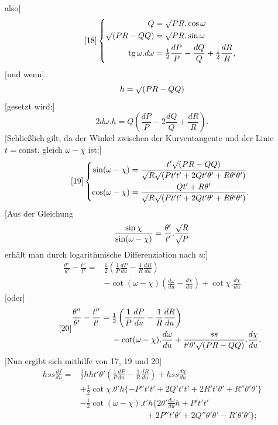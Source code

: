 %
\noindent also]
\begin{equation}\tag*{[18]}
\left\{\begin{aligned}
Q&=\mathord{\surd}PR.\cos\omega\\
\mathord{\surd}(PR-QQ)&=\mathord{\surd}PR.\sin\omega\\
\operatorname{tg}\omega.d\omega&=\tfrac12\frac{dP}{P}-\frac{dQ}{Q}+\tfrac12\frac{dR}{R},
\end{aligned}\right.
\end{equation}
[und wenn]
\[
h=\mathord{\surd}(PR-QQ)
\]
[gesetzt wird:]
\begin{equation}\tag*{[$18'$]}
2d\omega.h=Q\left(\frac{dP}{P}-2\frac{dQ}{Q}+\frac{dR}{R}\right).
\end{equation}
[Schließlich gilt, da der Winkel zwischen der Kurventangente und der Linie $t=\text{const.}$ gleich $\omega-\chi$ ist:]
\begin{equation}\tag*{[19]}
\left\{\begin{aligned}
\sin(\omega-\chi)&=\frac{t'\mathord{\surd}(PR-QQ)}{\mathord{\surd}R\mathord{\surd}(Pt't'+2Qt'\theta'+R\theta'\theta')}\\
\cos(\omega-\chi)&=\frac{Qt'+R\theta'}{\mathord{\surd}R\mathord{\surd}(Pt't'+2Qt'\theta'+R\theta'\theta')}.
\end{aligned}\right.
\end{equation}
[Aus der Gleichung
\[
\frac{\sin\chi}{\sin(\omega-\chi)}=\frac{\theta'}{t'}.\frac{\mathord{\surd}R}{\mathord{\surd}P}
\]
erhält man durch logarithmische Differenziation nach $u$:]
\[
\begin{aligned}
\frac{\theta''}{\theta'}-\frac{t''}{t'}={}&\tfrac12\left(\frac1P\frac{dP}{du}-\frac1R\frac{dR}{du}\right)\\
&-\cot(\omega-\chi)\left(\frac{d\omega}{du}-\frac{d\chi}{du}\right)+\cot\chi.\frac{d\chi}{du}
\end{aligned}
\]
[oder]
\begin{equation}\tag*{[20]}
\begin{aligned}
\frac{\theta''}{\theta'}-\frac{t''}{t'}={}&\tfrac12\left(\frac1P\frac{dP}{du}-\frac1R\frac{dR}{du}\right)\\
&-\cot(\omega-\chi).\frac{d\omega}{du}+\frac{ss}{t'\theta'\mathord{\surd}(PR-QQ)}.\frac{d\chi}{du}.
\end{aligned}
\end{equation}
[Nun ergibt sich mithilfe von 17, 19 und 20]
\[
\begin{aligned}
hss\frac{df}{du}={}&\tfrac12hht'\theta'\left(\frac1P\frac{dP}{du}-\frac1R\frac{dR}{du}\right)+hss\frac{d\chi}{du}\\
&+\tfrac12\cot\chi.\theta'h\{-P''t't'+2Q't't'+2R't'\theta'+R''\theta'\theta'\}\\
&-\tfrac12\cot(\omega-\chi).t'h\{2\theta'\frac{d\omega}{du}h+P't't'\\
&\hspace{8em}+2P''t'\theta'+2Q''\theta'\theta'-R'\theta'\theta'\};
\end{aligned}
\]
